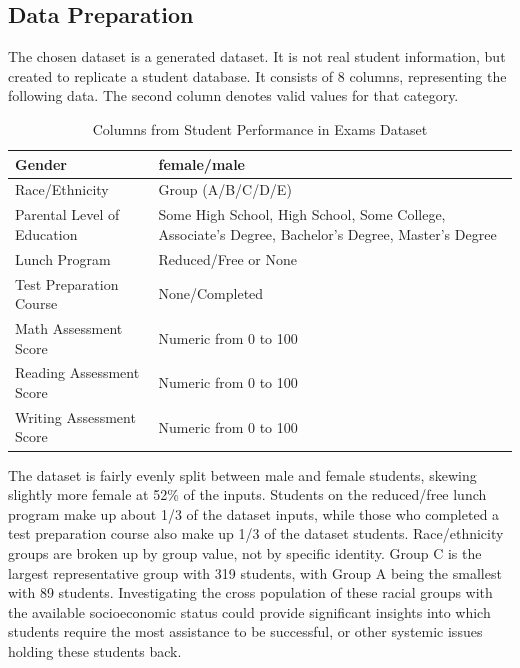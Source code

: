 \documentclass[doc]{apa6} %
\begin{document}
\subsection{Data Preparation}
The chosen dataset \cite{dataset} is a generated dataset. It is not real student information, but created to replicate a student database.  It consists of 8 columns, representing the following data.  The second column denotes valid values for that category.
\begin{table}[H]
    \centering
    \begin{tabular}{|l|p{8cm}|}
    \hline
        Gender & female/male\\
        \hline
        Race/Ethnicity & Group (A/B/C/D/E)\\
        \hline
        Parental Level of Education & Some High School, High School, Some College, Associate's Degree, Bachelor's Degree, Master's Degree\\
        \hline
        Lunch Program & Reduced/Free or None\\
        \hline
        Test Preparation Course & None/Completed\\
        \hline
        Math Assessment Score & Numeric from 0 to 100\\
        \hline
        Reading Assessment Score & Numeric from 0 to 100\\
        \hline
        Writing Assessment Score & Numeric from 0 to 100\\
        \hline
    \end{tabular}
    \caption{Columns from Student Performance in Exams Dataset}
    \label{tab:datasetCol}
\end{table}

The dataset is fairly evenly split between male and female students, skewing slightly more female at 52\% of the inputs. Students on the reduced/free lunch program make up about 1/3 of the dataset inputs, while those who completed a test preparation course also make up 1/3 of the dataset students. Race/ethnicity groups are broken up by group value, not by specific identity. Group C is the largest representative group with 319 students, with Group A being the smallest with 89 students. Investigating the cross population of these racial groups with the available socioeconomic status could provide significant insights into which students require the most assistance to be successful, or other systemic issues holding these students back.
\end{document}
